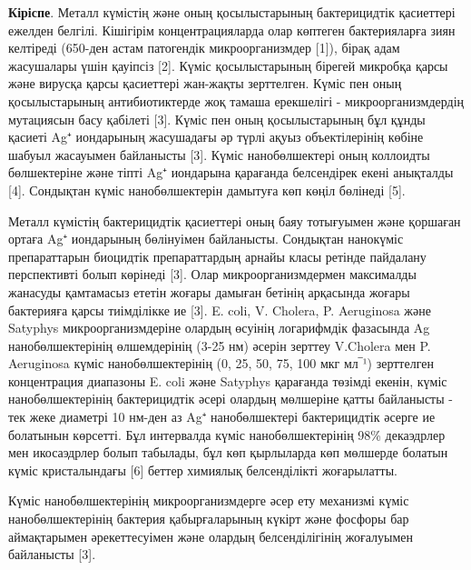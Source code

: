 \begin{multicols}{2}
{\bfseries Кіріспе}. Металл күмістің және оның қосылыстарының бактерицидтік
қасиеттері ежелден белгілі. Кішігірім концентрацияларда олар көптеген
бактерияларға зиян келтіреді (650-ден астам патогендік микроорганизмдер
{[}1{]}), бірақ адам жасушалары үшін қауіпсіз {[}2{]}. Күміс
қосылыстарының бірегей микробқа қарсы және вирусқа қарсы қасиеттері
жан-жақты зерттелген. Күміс пен оның қосылыстарының антибиотиктерде жоқ
тамаша ерекшелігі - микроорганизмдердің мутациясын басу қабілеті
{[}3{]}. Күміс пен оның қосылыстарының бұл құнды қасиеті Ag⁺ иондарының
жасушадағы әр түрлі ақуыз объектілерінің көбіне шабуыл жасауымен
байланысты {[}3{]}. Күміс нанобөлшектері оның коллоидты бөлшектеріне
және тіпті Ag⁺ иондарына қарағанда белсендірек екені анықталды {[}4{]}.
Сондықтан күміс нанобөлшектерін дамытуға көп көңіл бөлінеді {[}5{]}.

Металл күмістің бактерицидтік қасиеттері оның баяу тотығуымен және
қоршаған ортаға Ag⁺ иондарының бөлінуімен байланысты. Сондықтан
нанокүміс препараттарын биоцидтік препараттардың арнайы класы ретінде
пайдалану перспективті болып көрінеді {[}3{]}. Олар микроорганизмдермен
максималды жанасуды қамтамасыз ететін жоғары дамыған бетінің арқасында
жоғары бактерияға қарсы тиімділікке ие {[}3{]}. E. coli, V. Cholera, P.
Aeruginosa және Satyphys микроорганизмдеріне олардың өсуінің логарифмдік
фазасында Ag нанобөлшектерінің өлшемдерінің (3-25 нм) әсерін зерттеу
V.Cholera мен P. Aeruginosa күміс нанобөлшектерінің (0, 25, 50, 75, 100
мкг мл‾¹) зерттелген концентрация диапазоны E. coli және Satyphys
қарағанда төзімді екенін, күміс нанобөлшектерінің бактерицидтік әсері
олардың мөлшеріне қатты байланысты - тек жеке диаметрі 10 нм-ден аз Ag⁺
нанобөлшектері бактерицидтік әсерге ие болатынын көрсетті. Бұл
интервалда күміс нанобөлшектерінің 98\% декаэдрлер мен икосаэдрлер болып
табылады, бұл көп қырлыларда көп мөлшерде болатын күміс кристалындағы
{[}6{]} беттер химиялық белсенділікті жоғарылатты.

Күміс нанобөлшектерінің микроорганизмдерге әсер ету механизмі күміс
нанобөлшектерінің бактерия қабырғаларының күкірт және фосфоры бар
аймақтарымен әрекеттесуімен және олардың белсенділігінің жоғалуымен
байланысты {[}3{]}.


\end{multicols}
